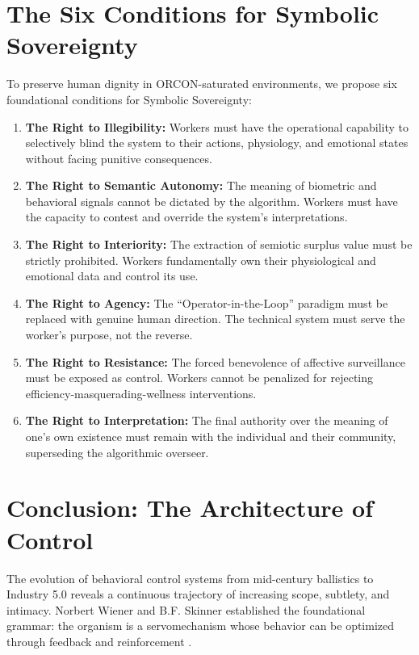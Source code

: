 \documentclass[11pt, a4paper]{article}
\begin{document}
\section{The Six Conditions for Symbolic Sovereignty}

To preserve human dignity in ORCON-saturated environments, we propose six foundational conditions for Symbolic Sovereignty:

\begin{enumerate}
    \item \textbf{The Right to Illegibility:} Workers must have the operational capability to selectively blind the system to their actions, physiology, and emotional states without facing punitive consequences.
    \item \textbf{The Right to Semantic Autonomy:} The meaning of biometric and behavioral signals cannot be dictated by the algorithm. Workers must have the capacity to contest and override the system's interpretations.
    \item \textbf{The Right to Interiority:} The extraction of semiotic surplus value must be strictly prohibited. Workers fundamentally own their physiological and emotional data and control its use.
    \item \textbf{The Right to Agency:} The ``Operator-in-the-Loop'' paradigm must be replaced with genuine human direction. The technical system must serve the worker's purpose, not the reverse.
    \item \textbf{The Right to Resistance:} The forced benevolence of affective surveillance must be exposed as control. Workers cannot be penalized for rejecting efficiency-masquerading-wellness interventions.
    \item \textbf{The Right to Interpretation:} The final authority over the meaning of one's own existence must remain with the individual and their community, superseding the algorithmic overseer.
\end{enumerate}

\section{Conclusion: The Architecture of Control}

The evolution of behavioral control systems from mid-century ballistics to Industry 5.0 reveals a continuous trajectory of increasing scope, subtlety, and intimacy. Norbert Wiener and B.F. Skinner established the foundational grammar: the organism is a servomechanism whose behavior can be optimized through feedback and reinforcement \cite{wiener1948cybernetics,skinner1953science}. 
\end{document}
